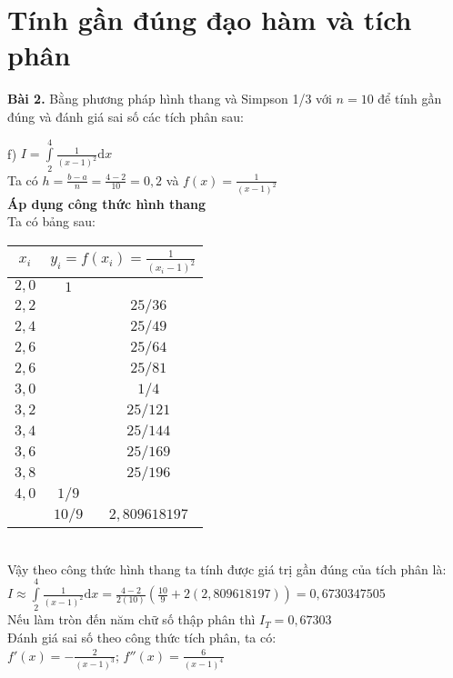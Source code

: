 \chapter{Tính gần đúng đạo hàm và tích phân}
\textbf{\color{blue}Bài 2.} Bằng phương pháp hình thang và Simpson 1/3 với $n=10$ để tính gần đúng và đánh giá sai số các tích phân sau:\par
f) $I= \int\limits^{4}_{2} \frac{1}{\left(x-1\right)^2}\mathrm{d}x$\\
Ta có $h=\frac{b-a}{n}=\frac{4-2}{10}=0,2$ và $f\left(x\right)=\frac{1}{\left(x-1\right)^2}$\\
\textbf{Áp dụng công thức hình thang}\\
Ta có bảng sau:\\
\begin{center}\begin{tabular}{|c|c|c|}
	\hline
	$x_i$ & \multicolumn{2}{|c|}{$y_i=f\left(x_i\right)=\frac{1}{\left(x_i-1\right)^2}$}\\
	\hline
	$2,0$ & $1$ & \\ \hline
	$2,2$ && $25/36$\\ \hline
	$2,4$ && $25/49$\\ \hline
	$2,6$ && $25/64$\\ \hline
	$2,6$ && $25/81$\\ \hline
	$3,0$ && $1/4$\\ \hline
	$3,2$ && $25/121$\\ \hline
	$3,4$ && $25/144$\\ \hline
	$3,6$ && $25/169$\\ \hline
	$3,8$ && $25/196$\\ \hline
	$4,0$ & $1/9$ & \\ \hline
	 & $10/9$ & $2,809618197$\\ \hline
\end{tabular}\end{center}\\
Vậy theo công thức hình thang ta tính được giá trị gần đúng của tích phân là:\\
$I\approx \int\limits^{4}_{2} \frac{1}{\left(x-1\right)^2}\mathrm{d}x=\frac{4-2}{2\left(10\right)}\left(\frac{10}{9}+2\left(2,809618197\right) \right) = 0,6730347505$\\
Nếu làm tròn đến năm chữ số thập phân thì $I_T = 0,67303$\\
Đánh giá sai số theo công thức tích phân, ta có:\\
$f'\left(x\right)=-\frac{2}{\left(x-1\right)^3}$; $f''\left(x\right)=\frac{6}{\left(x-1\right)^4}$\\
